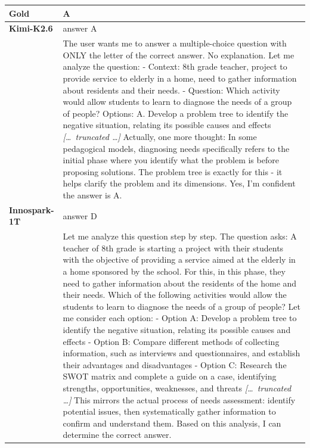 \begin{longtable}{@{}l p{12.5cm}@{}}
  \textbf{Gold} & A \\
  \midrule
  \textbf{Kimi-K2.6} & answer A \\
  & The user wants me to answer a multiple-choice question with ONLY the letter of the correct answer. No explanation. \newline Let me analyze the question: \newline - Context: 8th grade teacher, project to provide service to elderly in a home, need to gather information about residents and their needs. \newline - Question: Which activity would allow students to learn to diagnose the needs of a group of people? \newline Options: \newline A. Develop a problem tree to identify the negative situation, relating its possible causes and effects \newline \textit{[\ldots\ truncated \ldots]} \newline Actually, one more thought: In some pedagogical models, diagnosing needs specifically refers to the initial phase where you identify what the problem is before proposing solutions. The problem tree is exactly for this - it helps clarify the problem and its dimensions. \newline Yes, I'm confident the answer is A. \\
  \textbf{Innospark-1T} & answer D \\
  & Let me analyze this question step by step. \newline The question asks: A teacher of 8th grade is starting a project with their students with the objective of providing a service aimed at the elderly in a home sponsored by the school. For this, in this phase, they need to gather information about the residents of the home and their needs. Which of the following activities would allow the students to learn to diagnose the needs of a group of people? \newline Let me consider each option: \newline - Option A: Develop a problem tree to identify the negative situation, relating its possible causes and effects \newline - Option B: Compare different methods of collecting information, such as interviews and questionnaires, and establish their advantages and disadvantages \newline - Option C: Research the SWOT matrix and complete a guide on a case, identifying strengths, opportunities, weaknesses, and threats \newline \textit{[\ldots\ truncated \ldots]} \newline This mirrors the actual process of needs assessment: identify potential issues, then systematically gather information to confirm and understand them. \newline Based on this analysis, I can determine the correct answer. \\

\end{longtable}
